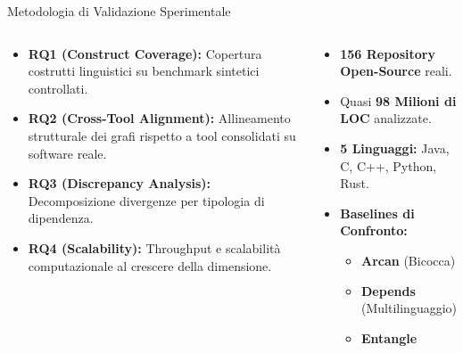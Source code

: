 \documentclass[aspectratio=169,10pt]{beamer}
\begin{document}
\begin{frame}{Metodologia di Validazione Sperimentale}
  \vspace{0.1em}
  \begin{columns}[c,onlytextwidth]
      \begin{cookiecard}[title={Le 4 Research Questions}]
        \small
        \begin{itemize}\setlength{\itemsep}{0.18em}
          \item \textbf{RQ1 (Construct Coverage):} Copertura costrutti linguistici su benchmark sintetici controllati.
          \item \textbf{RQ2 (Cross-Tool Alignment):} Allineamento strutturale dei grafi rispetto a tool consolidati su software reale.
          \item \textbf{RQ3 (Discrepancy Analysis):} Decomposizione divergenze per tipologia di dipendenza.
          \item \textbf{RQ4 (Scalability):} Throughput e scalabilità computazionale al crescere della dimensione.
        \end{itemize}
      \end{cookiecard}

      \begin{cookiecard}[title={Dataset \& Baselines}]
        \small
        \begin{itemize}\setlength{\itemsep}{0.2em}
          \item \textbf{156 Repository Open-Source} reali.
          \item Quasi \textbf{98 Milioni di LOC} analizzate.
          \item \textbf{5 Linguaggi:} Java, C, C++, Python, Rust.
          \item \textbf{Baselines di Confronto:}
            \begin{itemize}\setlength{\itemsep}{0.1em}
              \item \textbf{Arcan} (Bicocca)
              \item \textbf{Depends} (Multilinguaggio)
              \item \textbf{Entangle}
            \end{itemize}
        \end{itemize}
      \end{cookiecard}
  \end{columns}

\end{frame}
\end{document}
